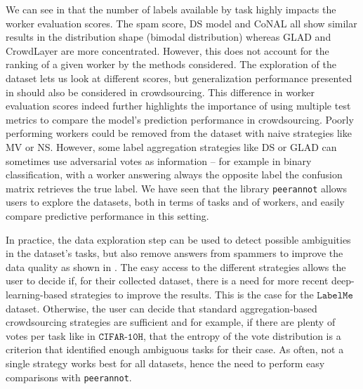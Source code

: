 We can see in  that the number of labels available by task highly impacts the worker evaluation scores.
The spam score, DS model and CoNAL all show similar results in the distribution shape (bimodal distribution) whereas GLAD and CrowdLayer are more concentrated.
However, this does not account for the ranking of a given worker by the methods considered.
The exploration of the dataset lets us look at different scores, but generalization performance presented in  should also be considered in crowdsourcing.
This difference in worker evaluation scores indeed further highlights the importance of using multiple test metrics to compare the model's prediction performance in crowdsourcing.
Poorly performing workers could be removed from the dataset with naive strategies like MV or NS.
However, some label aggregation strategies like DS or GLAD can sometimes use adversarial votes as information -- for example in binary classification, with a worker answering always the opposite label the confusion matrix retrieves the true label.
We have seen that the library \texttt{peerannot} allows users to explore the datasets, both in terms of tasks and of workers, and easily compare predictive performance in this setting.

In practice, the data exploration step can be used to detect possible ambiguities in the dataset's tasks, but also remove answers from spammers to improve the data quality as shown in .
The easy access to the different strategies allows the user to decide if, for their collected dataset, there is a need for more recent deep-learning-based strategies to improve the results.
This is the case for the $\texttt{LabelMe}$ dataset.
Otherwise, the user can decide that standard aggregation-based crowdsourcing strategies are sufficient and for example, if there are plenty of votes per task like in $\texttt{CIFAR-10H}$, that the entropy of the vote distribution is a criterion that identified enough ambiguous tasks for their case.
As often, not a single strategy works best for all datasets, hence the need to perform easy comparisons with \texttt{peerannot}.


